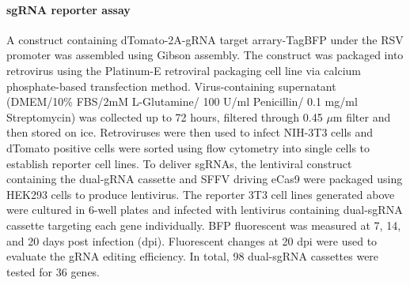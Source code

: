 \paragraph{sgRNA reporter assay}
A construct containing dTomato-2A-gRNA target arrary-TagBFP under the RSV promoter was assembled using Gibson assembly. The construct was packaged into retrovirus using the Platinum-E retroviral packaging cell line via calcium phosphate-based transfection method. Virus-containing supernatant (DMEM/10\% FBS/2mM L-Glutamine/ 100 U/ml Penicillin/ 0.1 mg/ml Streptomycin) was collected up to 72 hours, filtered through 0.45 $\mu$m filter and then stored on ice. Retroviruses were then used to infect NIH-3T3 cells and dTomato positive cells were sorted using flow cytometry into single cells to establish reporter cell lines. To deliver sgRNAs, the lentiviral construct containing the dual-gRNA cassette and SFFV driving eCas9 were packaged using HEK293 cells to produce lentivirus. The reporter 3T3 cell lines generated above were cultured in 6-well plates and infected with lentivirus containing dual-sgRNA cassette targeting each gene individually. BFP fluorescent was measured at 7, 14, and 20 days post infection (dpi). Fluorescent changes at 20 dpi were used to evaluate the gRNA editing efficiency. In total, 98 dual-sgRNA cassettes were tested for 36 genes.  

